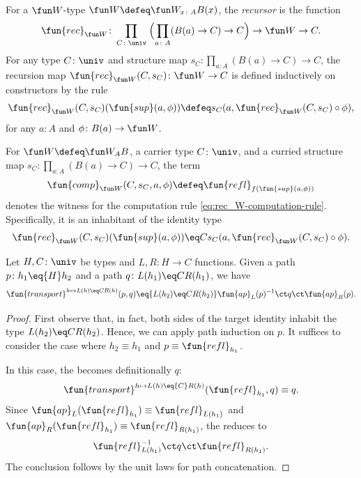 \begin{defn}
    For a $\fun W$-type $\fun W\defeq\fun W_{x\colon A}B(x)$, the \textsl{recursor} is the function
    \[
        \fun{rec}_{\fun W}\colon
            \prod_{C\colon\univ}\;
            \Bigl(
                \prod_{a\colon A}(B(a)\to C)\to C
            \Bigr)
            \to\fun W\to C.
    \]
    For any type $C\colon\univ$ and structure map $s_C\colon\prod_{a\colon A}(B(a)\to C)\to C$, the recursion map $\fun{rec}_{\fun W}(C, s_C)\colon\fun W\to C$ is defined inductively on constructors by the rule
    \[
        \fun{rec}_{\fun W}(C,s_C)(\fun{sup}(a,\phi))
        \defeq
        s_C(a,\fun{rec}_{\fun W}(C,s_C)\circ\phi),
    \]
    for any $a\colon A$ and $\phi\colon B(a)\to\fun W$.
\end{defn}

\begin{ntn}\label{ntn:recursor-commutativity}
    For $\fun W\defeq\fun W_AB$, a carrier type $C\colon\univ$, and a curried structure map $s_C\colon\prod_{a\colon A}(B(a)\to C)\to C$, the term
    \[
        \fun{comp}_{\fun W}(C,s_C,a,\phi)
        \defeq\fun{refl}_{f(\fun{sup}(a,\phi))}
    \]
    denotes the witness for the computation rule \eqref{eq:rec_W-computation-rule}. Specifically, it is an inhabitant of the identity type
    \begin{equation}\label{eq:recursor-commutativity}
        \fun{rec}_{\fun W}(C,s_C)(\fun{sup}(a,\phi))
        \eq C
        s_C(a,\fun{rec}_{\fun W}(C,s_C)\circ\phi).
    \end{equation}
\end{ntn}

\begin{lem}\label{lem:transport-identity-family}
    Let $H, C\colon\univ$ be types and $L, R\colon H \to C$ functions. Given a path $p\colon h_1\eq{H} h_2$ and a path $q\colon L(h_1)\eq CR(h_1)$, we have
    \[
        \fun{transport}^{h\mapsto L(h)\eq CR(h)}(p,q) 
        \eq{L(h_2)\eq CR(h_2)}
        \fun{ap}_L(p)^{-1}\ct q\ct\fun{ap}_R(p).
    \]
\end{lem}

\begin{proof}
    First observe that, in fact, both sides of the target identity inhabit the type $L(h_2)\eq CR(h_2)$. Hence, we can apply path induction on $p$. It suffices to consider the case where $h_2\equiv h_1$ and $p\equiv\fun{refl}_{h_1}$. 
    
    In this case, the \lhs becomes definitionally $q$:
    \[
        \fun{transport}^{h \mapsto L(h) \eq{C} R(h)}(\fun{refl}_{h_1}, q) \equiv q.
    \]
    Since $\fun{ap}_L(\fun{refl}_{h_1})\equiv \fun{refl}_{L(h_1)}$ and $\fun{ap}_R(\fun{refl}_{h_1})\equiv \fun{refl}_{R(h_1)}$, the \rhs reduces to
    \[
        \fun{refl}_{L(h_1)}^{-1}
            \ct q
            \ct\fun{refl}_{R(h_1)}.
    \]
    The conclusion follows by the unit laws for path concatenation.
\end{proof}

